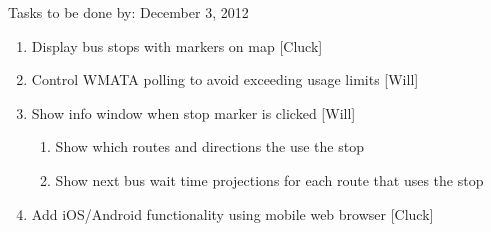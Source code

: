 \documentclass[12pt]{article}
\begin{document}
\begin{description}
\begin{enumerate}
	\end{enumerate}
	\item Tasks to be done by: December 3, 2012
	\begin{enumerate}
		\item Display bus stops with markers on map [Cluck]
		\item Control WMATA polling to avoid exceeding usage limits [Will]
		\item Show info window when stop marker is clicked [Will]
			\begin{enumerate}
				\item Show which routes and directions the use the stop
				\item Show next bus wait time projections for each route that uses the stop
			\end{enumerate}
		\item Add iOS/Android functionality using mobile web browser [Cluck]
	\end{enumerate}
\end{description}
\end{document}
